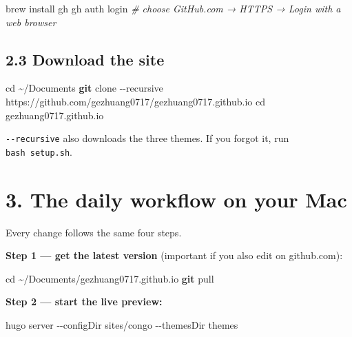 \documentclass[
  10pt,
]{article}
\newenvironment{Shaded}{\begin{snugshade}}{\end{snugshade}}
\newcommand{\AttributeTok}[1]{\textcolor[rgb]{0.13,0.29,0.53}{#1}}
\newcommand{\BuiltInTok}[1]{#1}
\newcommand{\CommentTok}[1]{\textcolor[rgb]{0.56,0.35,0.01}{\textit{#1}}}
\newcommand{\ExtensionTok}[1]{#1}
\newcommand{\FunctionTok}[1]{\textcolor[rgb]{0.13,0.29,0.53}{\textbf{#1}}}
\newcommand{\NormalTok}[1]{#1}
\begin{document}
\begin{Shaded}
\begin{Highlighting}[]
\ExtensionTok{brew}\NormalTok{ install gh}
\ExtensionTok{gh}\NormalTok{ auth login        }\CommentTok{\# choose GitHub.com → HTTPS → Login with a web browser}
\end{Highlighting}
\end{Shaded}

\hypertarget{download-the-site}{%
\subsection{2.3 Download the site}\label{download-the-site}}

\begin{Shaded}
\begin{Highlighting}[]
\BuiltInTok{cd}\NormalTok{ \textasciitilde{}/Documents}
\FunctionTok{git}\NormalTok{ clone }\AttributeTok{{-}{-}recursive}\NormalTok{ https://github.com/gezhuang0717/gezhuang0717.github.io}
\BuiltInTok{cd}\NormalTok{ gezhuang0717.github.io}
\end{Highlighting}
\end{Shaded}

\texttt{-\/-recursive} also downloads the three themes. If you forgot
it, run \texttt{bash\ setup.sh}.

\hypertarget{the-daily-workflow-on-your-mac}{%
\section{3. The daily workflow on your
Mac}\label{the-daily-workflow-on-your-mac}}

Every change follows the same four steps.

\textbf{Step 1 --- get the latest version} (important if you also edit
on github.com):

\begin{Shaded}
\begin{Highlighting}[]
\BuiltInTok{cd}\NormalTok{ \textasciitilde{}/Documents/gezhuang0717.github.io}
\FunctionTok{git}\NormalTok{ pull}
\end{Highlighting}
\end{Shaded}

\textbf{Step 2 --- start the live preview:}

\begin{Shaded}
\begin{Highlighting}[]
\ExtensionTok{hugo}\NormalTok{ server }\AttributeTok{{-}{-}configDir}\NormalTok{ sites/congo }\AttributeTok{{-}{-}themesDir}\NormalTok{ themes}
\end{Highlighting}
\end{Shaded}
\end{document}
